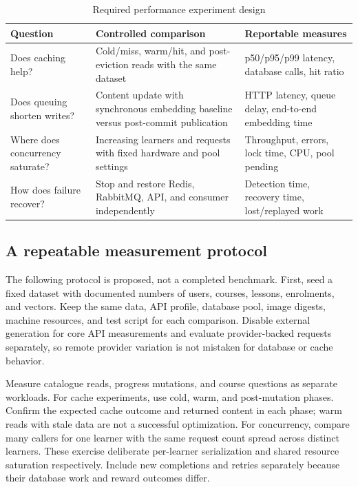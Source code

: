 \documentclass[12pt,a4paper,oneside]{report}
\begin{document}
\begin{table}[H]\centering
\caption{Required performance experiment design}\label{tab:performance-plan}
\begin{tabular}{P{0.26\textwidth}P{0.31\textwidth}P{0.32\textwidth}}\toprule
\textbf{Question} & \textbf{Controlled comparison} & \textbf{Reportable measures}\\\midrule
Does caching help? & Cold/miss, warm/hit, and post-eviction reads with the same dataset & p50/p95/p99 latency, database calls, hit ratio\\
Does queuing shorten writes? & Content update with synchronous embedding baseline versus post-commit publication & HTTP latency, queue delay, end-to-end embedding time\\
Where does concurrency saturate? & Increasing learners and requests with fixed hardware and pool settings & Throughput, errors, lock time, CPU, pool pending\\
How does failure recover? & Stop and restore Redis, RabbitMQ, API, and consumer independently & Detection time, recovery time, lost/replayed work\\
\bottomrule\end{tabular}
\end{table}

\subsection{A repeatable measurement protocol}
The following protocol is proposed, not a completed benchmark. First, seed a fixed
dataset with documented numbers of users, courses, lessons, enrolments, and vectors.
Keep the same data, API profile, database pool, image digests, machine resources,
and test script for each comparison. Disable external generation for core API
measurements and evaluate provider-backed requests separately, so remote provider
variation is not mistaken for database or cache behavior.

Measure catalogue reads, progress mutations, and course questions as separate
workloads. For cache experiments, use cold, warm, and post-mutation phases. Confirm
the expected cache outcome and returned content in each phase; warm reads with stale
data are not a successful optimization. For concurrency, compare many callers for
one learner with the same request count spread across distinct learners. These
exercise deliberate per-learner serialization and shared resource saturation
respectively. Include new completions and retries separately because their database
work and reward outcomes differ.
\end{document}
